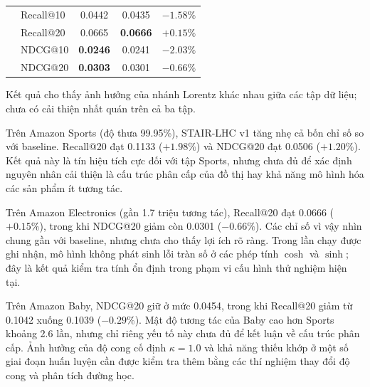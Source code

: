\begin{table}[htbp]
{\begin{tabular}{llccc}
        \midrule

        & Recall@10
        & 0.0442
        & 0.0435
        & $-1.58\%$ \\

        & Recall@20
        & 0.0665
        & \textbf{0.0666}
        & $+0.15\%$ \\

        & NDCG@10
        & \textbf{0.0246}
        & 0.0241
        & $-2.03\%$ \\

        & NDCG@20
        & \textbf{0.0303}
        & 0.0301
        & $-0.66\%$ \\

        \bottomrule
    \end{tabular}%
    }
\end{table}

Kết quả cho thấy ảnh hưởng của nhánh Lorentz khác nhau giữa các tập dữ liệu; chưa có cải thiện nhất quán trên cả ba tập.

Trên Amazon Sports (độ thưa 99.95\%), STAIR-LHC v1 tăng nhẹ cả bốn chỉ số so với baseline. Recall@20 đạt 0.1133 ($+1.98\%$) và NDCG@20 đạt 0.0506 ($+1.20\%$). Kết quả này là tín hiệu tích cực đối với tập Sports, nhưng chưa đủ để xác định nguyên nhân cải thiện là cấu trúc phân cấp của đồ thị hay khả năng mô hình hóa các sản phẩm ít tương tác.

Trên Amazon Electronics (gần 1.7 triệu tương tác), Recall@20 đạt 0.0666 ($+0.15\%$), trong khi NDCG@20 giảm còn 0.0301 ($-0.66\%$). Các chỉ số vì vậy nhìn chung gần với baseline, nhưng chưa cho thấy lợi ích rõ ràng. Trong lần chạy được ghi nhận, mô hình không phát sinh lỗi tràn số ở các phép tính $\cosh$ và $\sinh$; đây là kết quả kiểm tra tính ổn định trong phạm vi cấu hình thử nghiệm hiện tại.

Trên Amazon Baby, NDCG@20 giữ ở mức 0.0454, trong khi Recall@20 giảm từ 0.1042 xuống 0.1039 ($-0.29\%$). Mật độ tương tác của Baby cao hơn Sports khoảng 2.6 lần, nhưng chỉ riêng yếu tố này chưa đủ để kết luận về cấu trúc phân cấp. Ảnh hưởng của độ cong cố định $\kappa=1.0$ và khả năng thiếu khớp ở một số giai đoạn huấn luyện cần được kiểm tra thêm bằng các thí nghiệm thay đổi độ cong và phân tích đường học.




